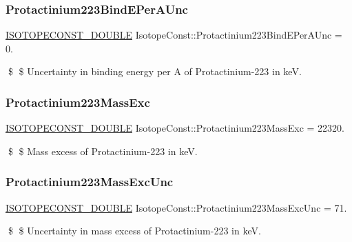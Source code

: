 \subsubsection{\texorpdfstring{Protactinium223\+Bind\+E\+Per\+A\+Unc}{Protactinium223BindEPerAUnc}}
{\footnotesize\ttfamily \mbox{\hyperlink{group___isotope_const-_macros_ga8f45a7272ce02c0b4c65c44636ed719a}{I\+S\+O\+T\+O\+P\+E\+C\+O\+N\+S\+T\+\_\+\+D\+O\+U\+B\+LE}} Isotope\+Const\+::\+Protactinium223\+Bind\+E\+Per\+A\+Unc = 0.}

\$ \$ Uncertainty in binding energy per A of Protactinium-\/223 in keV. \mbox{\label{group___isotope_const-_protactinium-_pa223_ga84f8f2fe83f76bf51030ef05a6242b35}} 
\subsubsection{\texorpdfstring{Protactinium223\+Mass\+Exc}{Protactinium223MassExc}}
{\footnotesize\ttfamily \mbox{\hyperlink{group___isotope_const-_macros_ga8f45a7272ce02c0b4c65c44636ed719a}{I\+S\+O\+T\+O\+P\+E\+C\+O\+N\+S\+T\+\_\+\+D\+O\+U\+B\+LE}} Isotope\+Const\+::\+Protactinium223\+Mass\+Exc = 22320.}

\$ \$ Mass excess of Protactinium-\/223 in keV. \mbox{\label{group___isotope_const-_protactinium-_pa223_ga85e0e707b671bb033ea2e9c52522cd53}} 
\subsubsection{\texorpdfstring{Protactinium223\+Mass\+Exc\+Unc}{Protactinium223MassExcUnc}}
{\footnotesize\ttfamily \mbox{\hyperlink{group___isotope_const-_macros_ga8f45a7272ce02c0b4c65c44636ed719a}{I\+S\+O\+T\+O\+P\+E\+C\+O\+N\+S\+T\+\_\+\+D\+O\+U\+B\+LE}} Isotope\+Const\+::\+Protactinium223\+Mass\+Exc\+Unc = 71.}

\$ \$ Uncertainty in mass excess of Protactinium-\/223 in keV. \mbox{\label{group___isotope_const-_protactinium-_pa223_ga0b7a35bad1d9a823e7a9a8fbf54435fb}} 
